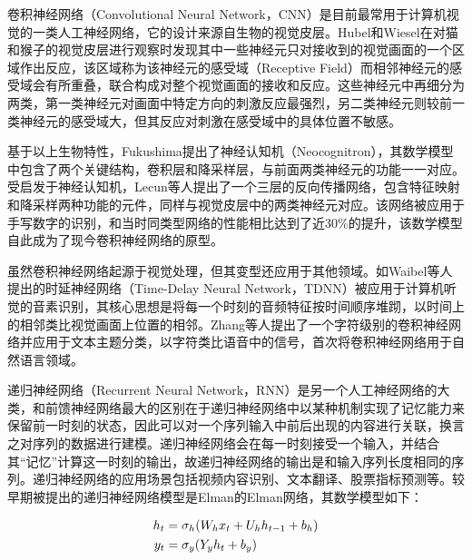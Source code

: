 卷积神经网络（Convolutional Neural Network，CNN）是目前最常用于计算机视觉的一类人工神经网络，它的设计来源自生物的视觉皮层。Hubel和Wiesel\cite{hubel1959receptive}\cite{hubel1968receptive}在对猫和猴子的视觉皮层进行观察时发现其中一些神经元只对接收到的视觉画面的一个区域作出反应，该区域称为该神经元的感受域（Receptive Field）而相邻神经元的感受域会有所重叠，联合构成对整个视觉画面的接收和反应。这些神经元中再细分为两类，第一类神经元对画面中特定方向的刺激反应最强烈，另二类神经元则较前一类神经元的感受域大，但其反应对刺激在感受域中的具体位置不敏感。

基于以上生物特性，Fukushima\cite{fukushima1980neocognitron}提出了神经认知机（Neocognitron），其数学模型中包含了两个关键结构，卷积层和降采样层，与前面两类神经元的功能一一对应。受启发于神经认知机，Lecun等人\cite{lecun1989backpropagation}提出了一个三层的反向传播网络，包含特征映射和降采样两种功能的元件，同样与视觉皮层中的两类神经元对应。该网络被应用于手写数字的识别，和当时同类型网络的性能相比达到了近30\%的提升，该数学模型自此成为了现今卷积神经网络的原型。

虽然卷积神经网络起源于视觉处理，但其变型还应用于其他领域。如Waibel等人\cite{waibel1995phoneme}提出的时延神经网络（Time-Delay Neural Network，TDNN）被应用于计算机听觉的音素识别，其核心思想是将每一个时刻的音频特征按时间顺序堆䟙，以时间上的相邻类比视觉画面上位置的相邻。Zhang等人\cite{zhang2015character}提出了一个字符级别的卷积神经网络并应用于文本主题分类，以字符类比语音中的信号，首次将卷积神经网络用于自然语言领域。

递归神经网络（Recurrent Neural Network，RNN）是另一个人工神经网络的大类，和前馈神经网络最大的区别在于递归神经网络中以某种机制实现了记忆能力来保留前一时刻的状态，因此可以对一个序列输入中前后出现的内容进行关联，换言之对序列的数据进行建模。递归神经网络会在每一时刻接受一个输入，并结合其“记忆”计算这一时刻的输出，故递归神经网络的输出是和输入序列长度相同的序列。递归神经网络的应用场景包括视频内容识别、文本翻译、股票指标预测等。较早期被提出的递归神经网络模型是Elman\cite{elman1990finding}的Elman网络，其数学模型如下：

\vspace{-10mm}
\begin{equation}
\vspace{-2.5mm}
\begin{aligned}
  \label{eq:elman_rnn}
  h_t &= \sigma_h (W_h x_t + U_h h_{t-1} + b_h) \\
  y_t &= \sigma_y (Y_y h_t + b_y)
\end{aligned}
\end{equation}

